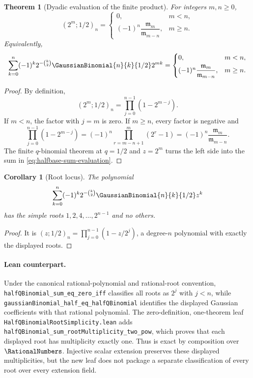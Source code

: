 \documentclass[11pt,a4paper,oneside,openany]{book}
\newtheorem{theorem}{Theorem}[chapter]
\newtheorem{corollary}[corollary]{Corollary}
\theoremstyle{definition}
\theoremstyle{remark}
\begin{document}
\begin{theorem}[Dyadic evaluation of the finite product]\label{thm:dyadic-product-evaluation}
For integers $m,n\ge0$,
\begin{equation}\label{eq:dyadic-product-evaluation}
 (2^m;1/2)_n
 =
 \begin{cases}
  0,&m<n,\\[3pt]
  (-1)^n\dfrac{\mathfrak m_m}{\mathfrak m_{m-n}},&m\ge n.
 \end{cases}
\end{equation}
Equivalently,
\begin{equation}\label{eq:halfbase-sum-evaluation}
 \sum_{k=0}^{n}(-1)^k2^{-\binom k2}
 \GaussianBinomial{n}{k}{1/2}2^{mk}
 =
 \begin{cases}
  0,&m<n,\\[3pt]
  (-1)^n\dfrac{\mathfrak m_m}{\mathfrak m_{m-n}},&m\ge n.
 \end{cases}
\end{equation}
\end{theorem}

\begin{proof}
By definition,
\[
 (2^m;1/2)_n=\prod_{j=0}^{n-1}(1-2^{m-j}).
\]
If $m<n$, the factor with $j=m$ is zero.  If $m\ge n$, every factor is negative and
\[
 \prod_{j=0}^{n-1}(1-2^{m-j})
 =(-1)^n\prod_{r=m-n+1}^{m}(2^r-1)
 =(-1)^n\frac{\mathfrak m_m}{\mathfrak m_{m-n}}.
\]
The finite $q$-binomial theorem at $q=1/2$ and $z=2^m$ turns the left side into the sum in \eqref{eq:halfbase-sum-evaluation}.
\end{proof}

\begin{corollary}[Root locus]\label{cor:halfbase-root-locus}
The polynomial
\[
 \sum_{k=0}^{n}(-1)^k2^{-\binom k2}\GaussianBinomial{n}{k}{1/2}z^k
\]
has the simple roots $1,2,4,\ldots,2^{n-1}$ and no others.
\end{corollary}

\begin{proof}
It is $(z;1/2)_n=\prod_{j=0}^{n-1}(1-z/2^j)$, a degree-$n$ polynomial with exactly the displayed roots.
\end{proof}

\paragraph{Lean counterpart.}
Under the canonical rational-polynomial and rational-root convention,
\nolinkurl{halfQBinomial_sum_eq_zero_iff} classifies all roots as
$2^j$ with $j<n$, while
\nolinkurl{gaussianBinomial_half_eq_halfQBinomial} identifies the displayed
Gaussian coefficients with that rational polynomial.  The
zero-definition, one-theorem leaf
\nolinkurl{HalfQBinomialRootSimplicity.lean} adds
\nolinkurl{halfQBinomial_sum_rootMultiplicity_two_pow}, which proves that
each displayed root has multiplicity exactly one.  Thus
 is exact by composition over $\RationalNumbers$.
Injective scalar extension preserves these displayed multiplicities, but the
new leaf does not package a separate classification of every root over every
extension field.
\end{document}
